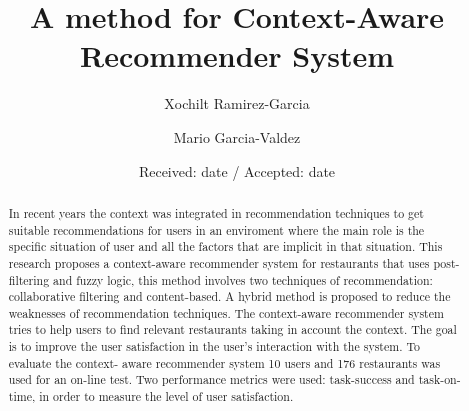\title{A method for Context-Aware Recommender System
}
\subtitle{}


\author{Xochilt Ramirez-Garcia \and Mario Garcia-Valdez %
}


\date{Received: date / Accepted: date}

\maketitle

\begin{abstract} 

In recent years the context was integrated in recommendation techniques to get
suitable recommendations for users in an enviroment where the main role is the
specific situation of user and all the factors that are implicit in that
situation. This research proposes a context-aware recommender system for
restaurants that uses post- filtering and fuzzy logic, this method involves two
techniques of recommendation: collaborative filtering and content-based. A
hybrid method is proposed to reduce the weaknesses of recommendation techniques.
The context-aware recommender system tries to help users to find relevant
restaurants taking in account the context. The goal is to improve the user
satisfaction in the user's interaction with the system. To evaluate the context-
aware recommender system 10 users and 176 restaurants was used for an on-line
test. Two performance metrics were used: task-success and task-on-time, in order
to measure the level of user satisfaction.

%


\end{abstract}

